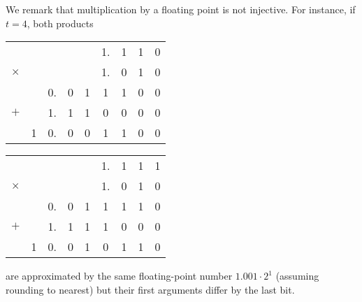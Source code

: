 We remark that multiplication by a floating point is not injective. For instance, if $t = 4$, both products
\begin{center}
	\parbox{0.45\textwidth}{\centering
		\begin{tabular}{c@{\;}c@{\;}c@{\,}c@{\,}c@{\,}c@{\,}c@{\,}c@{\,}c}
			& & & & & 1. & 1 & 1 & 0 \\
			$\times$ & & & & & 1. & 0 & 1 & 0 \\
			\hline
			& & 0. & 0 & 1 & 1 & 1 & 0 & 0 \\
			$+$ & & 1. & 1 & 1 & 0 & 0 & 0 & 0 \\
			\hline
			& 1 & 0. & 0 & 0 & 1 & 1 & 0 & 0
	\end{tabular}}
	\parbox{0.45\textwidth}{\centering
		\begin{tabular}{c@{\;}c@{\;}c@{\,}c@{\,}c@{\,}c@{\,}c@{\,}c@{\,}c}
			& & & & & 1. & 1 & 1 & 1 \\
			$\times$ & & & & & 1. & 0 & 1 & 0 \\
			\hline
			& & 0. & 0 & 1 & 1 & 1 & 1 & 0\\
			$+$ & & 1. & 1 & 1 & 1 & 0 & 0 & 0 \\
			\hline
			& 1 & 0. & 0 & 1 & 0 & 1 & 1 & 0
	\end{tabular}}
\end{center}
are approximated by the same floating-point number $1.001 \cdot 2^1$ (assuming rounding to nearest) but their first arguments differ by the last bit.

